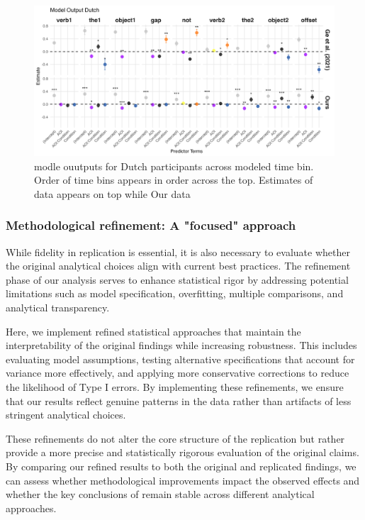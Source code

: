 \begin{figure}[H]  %
    \centering
    \includegraphics[width=\textwidth,height=\textheight,keepaspectratio]{viz/model_plot_dutch.png}
    \caption{modle ouutputs for Dutch participants across modeled time bin. Order of time bins appears in order across the top.   Estimates of \citep{Ge2021} data appears on top while Our data}
    \label{fig:model_plot_dutch}
\end{figure}


\subsubsection{Methodological refinement: A "focused" approach}

While fidelity in replication is essential, it is also necessary to evaluate whether the original analytical choices align with current best practices. The refinement phase of our analysis serves to enhance statistical rigor by addressing potential limitations such as model specification, overfitting, multiple comparisons, and analytical transparency.

Here, we implement refined statistical approaches that maintain the interpretability of the original findings while increasing robustness. This includes evaluating model assumptions, testing alternative specifications that account for variance more effectively, and applying more conservative corrections to reduce the likelihood of Type I errors. By implementing these refinements, we ensure that our results reflect genuine patterns in the data rather than artifacts of less stringent analytical choices.

These refinements do not alter the core structure of the replication but rather provide a more precise and statistically rigorous evaluation of the original claims. By comparing our refined results to both the original and replicated findings, we can assess whether methodological improvements impact the observed effects and whether the key conclusions of \citep{Ge2021} remain stable across different analytical approaches.

